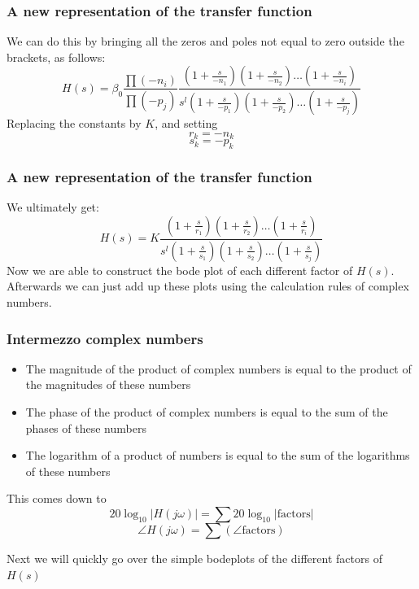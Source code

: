 \begin{frame}
\frametitle{A new representation of the transfer function}
We can do this by bringing all the zeros and poles not equal to zero outside the brackets, as follows:
$$H(s) = \beta_0 \frac{\prod(-n_i)}{\prod(-p_j)} \frac{(1+\frac{s}{-n_1}) (1+\frac{s}{-n_2}) \ldots (1+\frac{s}{-n_i})}{s^l (1+\frac{s}{-p_1}) (1+\frac{s}{-p_2}) \ldots (1 + \frac{s}{-p_j})}$$
 Replacing the constants by $K$, and setting $$r_k = -n_k$$ $$ s_k = -p_k$$ 



\end{frame}



\begin{frame}
\frametitle{A new representation of the transfer function}

We ultimately get: $$H(s) = K \frac{(1+\frac{s}{r_1}) (1+\frac{s}{r_2}) \ldots (1+\frac{s}{r_i})}{s^l (1+\frac{s}{s_1}) (1+\frac{s}{s_2}) \ldots (1 + \frac{s}{s_j})}$$
Now we are able to construct the bode plot of each different factor of $H(s)$. Afterwards we can just add up these plots using the calculation rules of complex numbers.

  
\end{frame}



\begin{frame}
\frametitle{Intermezzo complex numbers}
\begin{itemize}
\item The magnitude of the product of complex numbers is equal to the product of the magnitudes of these numbers
\item The phase of the product of complex numbers is equal to the sum of the phases of these numbers
\item The logarithm of a product of numbers is equal to the sum of the logarithms of these numbers

\end{itemize}
This comes down to 
$$ 20\log_{10}|H(j\omega)| = \sum 20\log_{10}|\text{factors}| $$ 
$$ \angle H(j\omega) = \sum(\angle \text{factors})$$

Next we will quickly go over the simple bodeplots of the different factors of $H(s)$

\end{frame}



